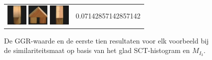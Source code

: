 \begin{figure}[!bp]
\begin{tabular}{m{11cm} | m{3cm} |}
\includegraphics[width=1cm]{coil/beeld-2.eps}
\includegraphics[width=1cm]{coil/beeld-43.eps}
\includegraphics[width=1cm]{coil/beeld-47.eps}
& {\scriptsize 0.07142857142857142}
\\
\end{tabular}
\vspace{5pt}
\caption{\label{fig:results_sct_glad_histgeb}De GGR-waarde en de eerste tien resultaten voor elk 
voorbeeld bij de similariteitsmaat op basis van het glad SCT-histogram en $M_{I_3}$.}
\end{figure}

